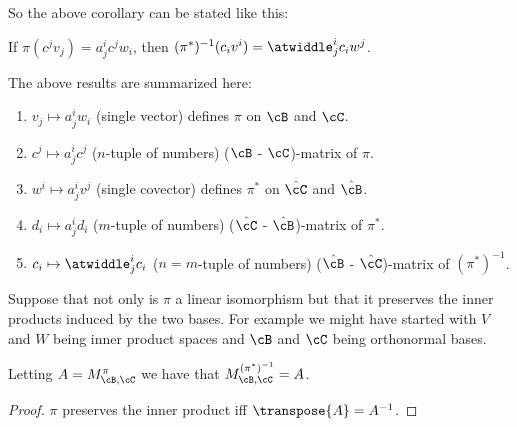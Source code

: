 \documentclass[oneside,12pt]{amsart}
\begin{document}
So the above corollary can be stated like this:

If $\pi(c^j v_j) = a^i_j c^j w_i$, then
$(\pi^*)^{-1} (c_i v^i) = \atwiddle^i_j c_i w^j$.

\begin{remarks}
The above results are summarized here:
\begin{enumerate}
\item $v_j \mapsto a^i_j w_i$ (single vector) defines $\pi$ on  $\cB$ and $\cC$.
\item $c^j \mapsto a^i_j c ^j$ ($n$-tuple of numbers) ($\cB$ - $\cC$)-matrix of $\pi$.
\item $w^i \mapsto a^i_j v^j$ (single covector) defines $\pi^*$ on $\hat{\cC}$ and $\hat{\cB}$.
\item $d_i \mapsto a^i_j d_i$ ($m$-tuple of numbers) ($\hat{\cC}$ - $\hat{\cB}$)-matrix of $\pi^*$.
\item $c_i \mapsto \atwiddle^i_j c_i$ ($n=m$-tuple of numbers) ($\hat{\cB}$ - $\hat{\cC}$)-matrix of $(\pi^*)^{-1}$.
\end{enumerate}
\end{remarks}



\begin{corollary}
Suppose that not only is $\pi$ a linear isomorphism but that it preserves
the inner products induced by the two bases. For example we might have
started with $V$ and $W$ being inner product spaces and $\cB$ and $\cC$
being orthonormal bases.

Letting $A = M^{\pi}_{\cB,\cC}$ we have that
$M^{(\pi^*)^{-1}}_{\cB,\cC} = A$.
\end{corollary}
\begin{proof}
$\pi$ preserves the inner product iff $\transpose{A} = A^{-1}$.
\end{proof}
\end{document}
